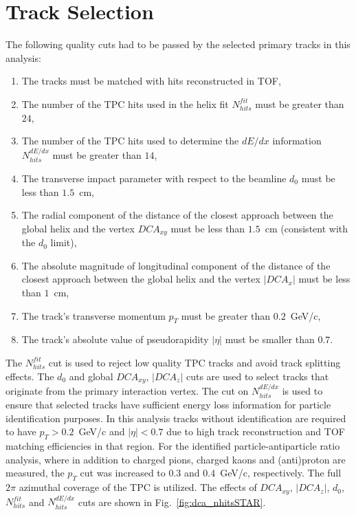 \section{Track Selection}\label{section:star_track_selection}
The following quality cuts had to be passed by the selected primary tracks in this analysis:
\begin{enumerate}
	\item The tracks must be matched with hits reconstructed in TOF,
	\item The number of the  TPC hits used in the helix fit $N_{hits}^{fit}$ must be greater than $24$,
	\item The number of the  TPC hits used to determine the $dE/dx$ information $N_{hits}^{dE/dx}$ must be greater than $14$,
	\item The transverse impact parameter with respect to the beamline $d_0$ must be less than $1.5$~cm,
	\item The radial component of the distance of the closest approach between  the global helix and the vertex $DCA_{xy}$ must be less than $1.5$~cm (consistent with the $d_0$ limit),
	\item The absolute magnitude of  longitudinal component of the distance of the closest approach between  the global helix and the vertex $|DCA_{x}|$ must be less than $1$~cm,
	\item The track's transverse momentum $p_T$ must be greater than $0.2$~GeV/c,
	\item The track's absolute value of  pseudorapidity $|\eta|$ must be smaller than $0.7$.
\end{enumerate}
The $N_{hits}^{fit}$ cut is used to reject low quality TPC tracks and avoid track splitting effects. The $d_0$ and global $DCA_{xy}$,  $|DCA_{z}|$ cuts are used to select tracks that originate from the primary interaction vertex. The cut on $N_{hits}^{dE/dx}$ is used to ensure that selected tracks have sufficient energy loss information
for particle identification purposes. In this analysis tracks without identification are required to have $p_T > 0.2$~GeV/c and $|\eta| < 0.7$ due to high track reconstruction and TOF matching efficiencies in that region. For the identified particle-antiparticle ratio analysis, where in addition to charged pions, charged kaons and (anti)proton  are measured, the $p_T$ cut was increased  to $0.3$ and $0.4$~GeV/c, respectively. The full $2\pi$ azimuthal coverage of the TPC is utilized.
The effects of $DCA_{xy}$, $|DCA_{z}|$, $d_0$, $N_{hits}^{fit}$ and $N_{hits}^{dE/dx}$ cuts are shown in Fig.~\ref{fig:dca_nhitsSTAR}. 
